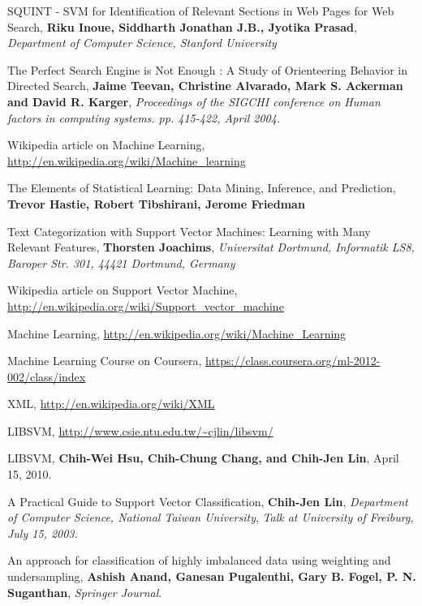 \documentclass[a4paper,10pt]{report}
\begin{document}
\clearpage
{}
\begin{thebibliography}{99}

 SQUINT - SVM for Identification of Relevant Sections in Web Pages for Web Search, \textbf{Riku Inoue, Siddharth Jonathan J.B., Jyotika Prasad}, \emph{Department of Computer Science, Stanford University}

 The Perfect Search Engine is Not Enough : A Study of Orienteering Behavior in Directed Search, \textbf{Jaime Teevan, Christine Alvarado, Mark S. Ackerman and David R. Karger}, \emph{Proceedings of the SIGCHI conference on Human factors in computing systems. pp. 415-422, April 2004.}

 Wikipedia article on Machine Learning, \url{http://en.wikipedia.org/wiki/Machine_learning}

 The Elements of Statistical Learning: Data Mining, Inference, and Prediction, \textbf{Trevor Hastie, Robert Tibshirani, Jerome Friedman}

 Text Categorization with Support Vector Machines: Learning with Many Relevant Features, \textbf{Thorsten Joachims}, \emph{Universitat Dortmund, Informatik LS8, Baroper Str. 301, 44421 Dortmund, Germany}

 Wikipedia article on Support Vector Machine, \url{http://en.wikipedia.org/wiki/Support_vector_machine}

 Machine Learning, \url{http://en.wikipedia.org/wiki/Machine_Learning}

 Machine Learning Course on Coursera, \url{https://class.coursera.org/ml-2012-002/class/index}

 XML, \url{http://en.wikipedia.org/wiki/XML}

 LIBSVM, \url{http://www.csie.ntu.edu.tw/~cjlin/libsvm/}

 LIBSVM, \textbf{Chih-Wei Hsu, Chih-Chung Chang, and Chih-Jen Lin}, April 15, 2010.

 A Practical Guide to Support Vector Classification, \textbf{Chih-Jen Lin}, \emph{Department of Computer Science, National Taiwan University}, \emph{Talk at University of Freiburg},\emph{ July 15, 2003.}

 An approach for classification of highly imbalanced data using weighting and undersampling, \textbf{Ashish Anand, Ganesan Pugalenthi, Gary B. Fogel, P. N. Suganthan}, \emph{Springer Journal}.


\end{thebibliography}
\end{document}
